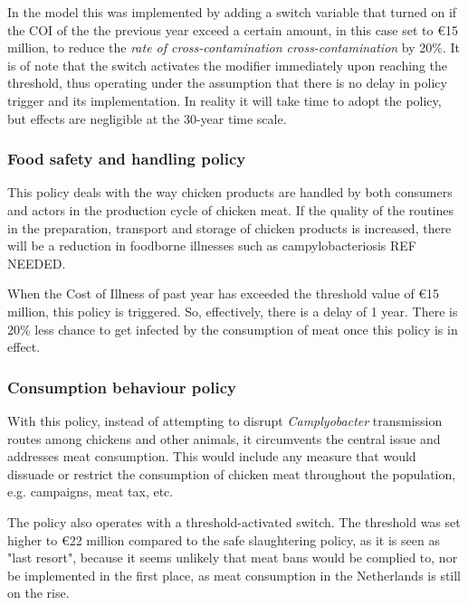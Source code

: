 In the model this was implemented by adding a switch variable that turned on if the COI of the the previous year exceed a certain amount, in this case set to \euro 15 million, to reduce the \textit{rate of cross-contamination cross-contamination} by 20\%. It is of note that the switch activates the modifier immediately upon reaching the threshold, thus operating under the assumption that there is no delay in policy trigger and its implementation. In reality it will take time to adopt the policy, but effects are negligible at the 30-year time scale.

\subsubsection{Food safety and handling policy}
This policy deals with the way chicken products are handled by both consumers and actors in the production cycle of chicken meat. If the quality of the routines in the preparation, transport and storage of chicken  products is increased, there will be a reduction in foodborne illnesses such as campylobacteriosis REF NEEDED.

When the Cost of Illness of past year has exceeded the threshold value of \euro 15 million, this policy is triggered. So, effectively, there is a delay of 1 year. There is 20\% less chance to get infected by the consumption of meat once this policy is in effect.

\subsubsection{Consumption behaviour policy}
With this policy, instead of attempting to disrupt \textit{Camplyobacter} transmission routes among chickens and other animals, it circumvents the central issue and addresses meat consumption. This would include any measure that would dissuade or restrict the consumption of chicken meat throughout the population, e.g. campaigns, meat tax, etc.

The policy also operates with a threshold-activated switch. The threshold was set higher to \euro 22 million compared to the safe slaughtering policy, as it is seen as "last resort", because it seems unlikely that meat bans would be complied to, nor be implemented in the first place, as meat consumption in the Netherlands is still on the rise.

